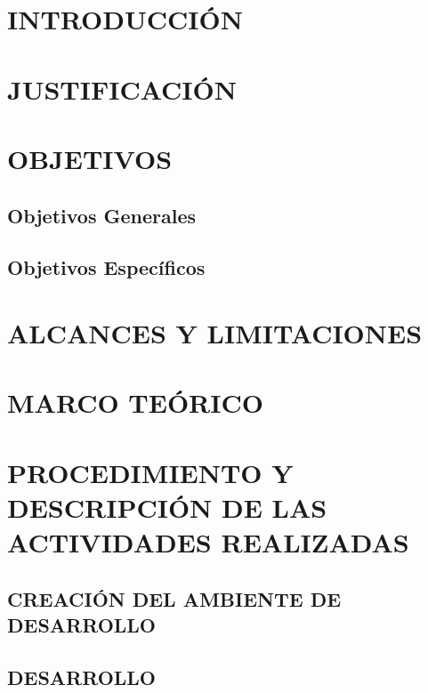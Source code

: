 \documentclass[a4paper,12pt]{report}
\begin{document}
	\tableofcontents
	
		\chapter {INTRODUCCIÓN}
			
		\chapter {JUSTIFICACIÓN }
			
		
		\chapter {OBJETIVOS }
			\section {Objetivos Generales}
				
			
			\section {Objetivos Específicos} 
				
			
		\chapter {ALCANCES Y LIMITACIONES }
		
		\chapter {MARCO TEÓRICO  }
			
		
		\chapter {PROCEDIMIENTO Y DESCRIPCIÓN DE LAS ACTIVIDADES REALIZADAS}
			
			
			\section {CREACIÓN DEL AMBIENTE DE DESARROLLO}
				
				
			\section {DESARROLLO}
				
				
\end{document}
